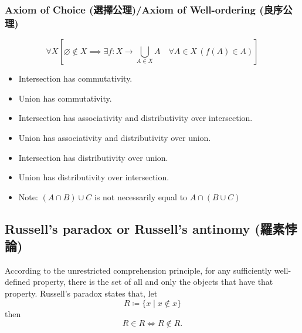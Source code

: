 \documentclass[a4paper,12pt]{article}
\begin{document}
\subsubsection{Axiom of Choice (選擇公理)/Axiom of Well-ordering (良序公理)}
\[ \forall X\left[\varnothing \notin X\implies \exists f\colon X\rightarrow \bigcup _{A\in X}A\quad \forall A\in X\,(f(A)\in A)\right]\]
\begin{itemize}
\item Intersection has commutativity.
\item Union has commutativity.
\item Intersection has associativity and distributivity over intersection.
\item Union has associativity and distributivity over union.
\item Intersection has distributivity over union.
\item Union has distributivity over intersection.
\item Note: $(A\cap B)\cup C$ is not necessarily equal to $A\cap (B\cup C)$
\end{itemize}
\subsection{Russell's paradox or Russell's antinomy (羅素悖論)}
According to the unrestricted comprehension principle, for any sufficiently well-defined property, there is the set of all and only the objects that have that property. Russell's paradox states that, let
\[R\coloneq\{x\mid x\not \in x\}\]
then
\[R\in R\iff R\not \in R.\]
\end{document}
